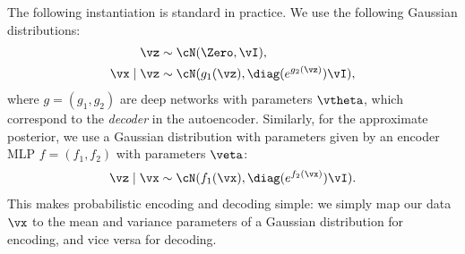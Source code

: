 \documentclass[../../book-main.tex]{subfiles}
\begin{document}
The following instantiation is standard in practice. We use the following
Gaussian distributions:
\begin{align*}
    \vz &\sim \cN(\Zero, \vI), \\
    \vx \mid \vz &\sim \cN(g_1(\vz), \diag(e^{g_2(\vz)}) \vI),
\end{align*}
where $g = (g_1, g_2)$ are deep networks with parameters $\vtheta$, which
correspond to the \textit{decoder} in the autoencoder.
Similarly, for the approximate posterior, we use
a Gaussian distribution with parameters given by an encoder
MLP $f = (f_1, f_2)$ with parameters $\veta$:
\begin{equation*}
    \vz \mid \vx \sim \cN(f_1(\vx), \diag(e^{f_2(\vx)}) \vI).
\end{equation*}
This makes probabilistic encoding and decoding simple: we simply map our data
$\vx$ to the mean and variance parameters of a Gaussian distribution for
encoding, and vice versa for decoding.
\end{document}

